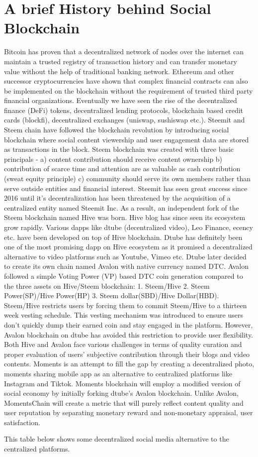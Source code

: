 \documentclass[a4paper]{article}
\begin{document}
\section{A brief History behind Social Blockchain}    
    Bitcoin has proven that a decentralized network of nodes over the internet can maintain a trusted registry of transaction history and can transfer monetary value without the help of traditional banking network. Ethereum and other successor cryptocurrencies have shown that complex financial contracts can also be implemented on the blockchain without the requirement of trusted third party financial organizations. Eventually we have seen the rise of the decentralized finance (DeFi) tokens, decentralized lending protocols, blockchain based credit cards (blockfi), decentralized exchanges (uniswap, sushiswap etc.). Steemit and Steem chain have followed the blockchain revolution by introducing social blockchain where social content viewership and user engagement data are stored as transactions in the block. Steem blockchain was created with three basic principals - a) content contribution should receive content ownership b) contribution of scarce time and attention are as valuable as cash contribution (sweat equity principle) c) community should serve its own members rather than serve outside entities and financial interest. Steemit has seen great success since 2016 until it's decentralization has been threatened by the acquisition of a centralized entity named Steemit Inc. As a result, an independent fork of the Steem blockchain named Hive was born. Hive blog has since seen its ecosystem grow rapidly. Various dapps like dtube (decentralized video), Leo Finance, ecency etc. have been developed on top of Hive blockchain. Dtube has definitely been one of the most promising dapp on Hive ecosystem as it promised a decentralized alternative to video platforms such as Youtube, Vimeo etc. Dtube later decided to create its own chain named Avalon with native currency named DTC. Avalon followed a simple Voting Power (VP) based DTC coin generation compared to the three assets on Hive/Steem blockchain: 1. Steem/Hive 2. Steem Power(SP)/Hive Power(HP) 3. Steem dollar(SBD)/Hive Dollar(HBD). Steem/Hive restricts users by forcing them to commit Steem/Hive to a thirteen week vesting schedule. This vesting mechanism was introduced to ensure users don't quickly dump their earned coin and stay engaged in the platform. However, Avalon blockchain on dtube has avoided this restriction to provide user flexibility. Both Hive and Avalon face various challenges in terms of quality curation and proper evaluation of users' subjective contribution through their blogs and video contents. Moments is an attempt to fill the gap by creating a decentralized photo, moments sharing mobile app as an alternative to centralized platforms like Instagram and Tiktok. Moments blockchain will employ a modified version of social economy by initially forking dtube's Avalon blockchain. Unlike Avalon, MomentsChain will create a metric that will purely reflect content quality and user reputation by separating monetary reward and non-monetary appraisal, user satisfaction. 
    \par This table below shows some decentralized social media alternative to the centralized platforms. 
    
\end{document}
